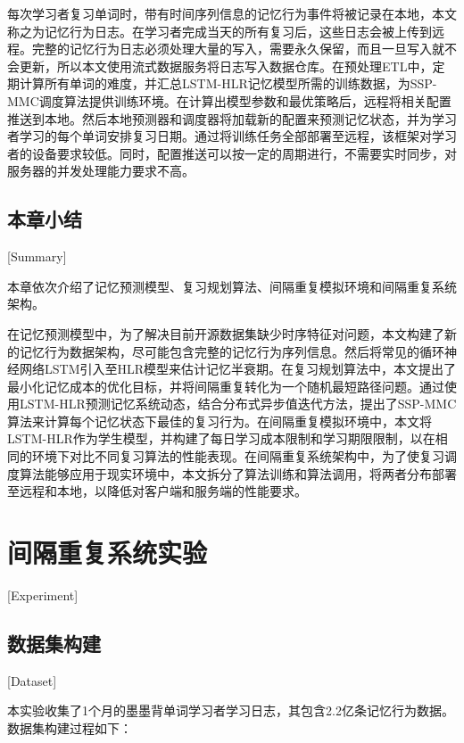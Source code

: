 每次学习者复习单词时，带有时间序列信息的记忆行为事件将被记录在本地，本文称之为记忆行为日志。在学习者完成当天的所有复习后，这些日志会被上传到远程。完整的记忆行为日志必须处理大量的写入，需要永久保留，而且一旦写入就不会更新，所以本文使用流式数据服务将日志写入数据仓库。在预处理ETL中，定期计算所有单词的难度，并汇总LSTM-HLR记忆模型所需的训练数据，为SSP-MMC调度算法提供训练环境。在计算出模型参数和最优策略后，远程将相关配置推送到本地。然后本地预测器和调度器将加载新的配置来预测记忆状态，并为学习者学习的每个单词安排复习日期。通过将训练任务全部部署至远程，该框架对学习者的设备要求较低。同时，配置推送可以按一定的周期进行，不需要实时同步，对服务器的并发处理能力要求不高。

\section{本章小结}[Summary]

本章依次介绍了记忆预测模型、复习规划算法、间隔重复模拟环境和间隔重复系统架构。

在记忆预测模型中，为了解决目前开源数据集缺少时序特征对问题，本文构建了新的记忆行为数据架构，尽可能包含完整的记忆行为序列信息。然后将常见的循环神经网络LSTM引入至HLR模型来估计记忆半衰期。在复习规划算法中，本文提出了最小化记忆成本的优化目标，并将间隔重复转化为一个随机最短路径问题。通过使用LSTM-HLR预测记忆系统动态，结合分布式异步值迭代方法，提出了SSP-MMC算法来计算每个记忆状态下最佳的复习行为。在间隔重复模拟环境中，本文将LSTM-HLR作为学生模型，并构建了每日学习成本限制和学习期限限制，以在相同的环境下对比不同复习算法的性能表现。在间隔重复系统架构中，为了使复习调度算法能够应用于现实环境中，本文拆分了算法训练和算法调用，将两者分布部署至远程和本地，以降低对客户端和服务端的性能要求。

\chapter{间隔重复系统实验}[Experiment]

\section{数据集构建}[Dataset]

本实验收集了1个月的墨墨背单词学习者学习日志，其包含2.2亿条记忆行为数据。数据集构建过程如下：

